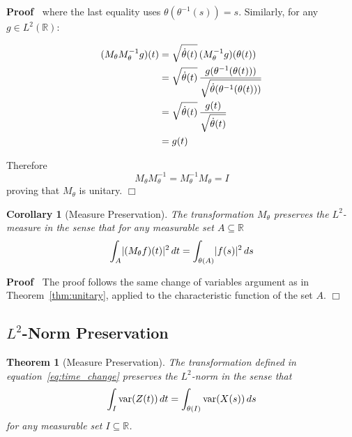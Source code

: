 \documentclass{article}
\newenvironment{proof}{\noindent\textbf{Proof\ }}{\hspace*{\fill}$\Box$\medskip}
\newtheorem{corollary}{Corollary}
\newtheorem{theorem}{Theorem}
\begin{document}
\begin{proof}
  where the last equality uses $\theta (\theta^{- 1} (s)) = s$. Similarly, for
  any $g \in L^2 (\mathbb{R})$:
  
  \begin{align}
    (M_{\theta} M_{\theta}^{- 1} g) (t) & = \sqrt{\dot{\theta} (t)} 
    \hspace{0.17em} (M_{\theta}^{- 1} g) (\theta (t)) \\
    & = \sqrt{\dot{\theta} (t)}  \hspace{0.17em} \frac{g (\theta^{- 1}
    (\theta (t)))}{\sqrt{\dot{\theta} (\theta^{- 1} (\theta (t)))}} \\
    & = \sqrt{\dot{\theta} (t)}  \hspace{0.17em} \frac{g
    (t)}{\sqrt{\dot{\theta} (t)}} \\
    & = g (t) 
  \end{align}
  
  Therefore
  \begin{equation}
    M_{\theta} M_{\theta}^{- 1} = M_{\theta}^{- 1} M_{\theta} = I
  \end{equation}
  proving that $M_{\theta}$ is unitary.
\end{proof}

\begin{corollary}
  [Measure Preservation]\label{cor:measure_preserve} The transformation
  $M_{\theta}$ preserves the $L^2$-measure in the sense that for any
  measurable set $A \subseteq \mathbb{R}$
  \begin{equation}
    \label{eq:measure_preserve_sets} \int_A \lvert (M_{\theta} f) (t) \rvert^2
    \hspace{0.17em} dt = \int_{\theta (A)} \lvert f (s) \rvert^2 
    \hspace{0.17em} ds
  \end{equation}
\end{corollary}

\begin{proof}
  The proof follows the same change of variables argument as in
  Theorem~\ref{thm:unitary}, applied to the characteristic function of the set
  $A$.
\end{proof}

\subsection{$L^2$-Norm Preservation}\label{sec:norm_preservation}

\begin{theorem}
  [Measure Preservation]\label{thm:measure_preserve} The transformation
  defined in equation~\eqref{eq:time_change} preserves the $L^2$-norm in the
  sense that
  \begin{equation}
    \label{eq:measure_preserve} \int_I \mathrm{var} (Z (t))  \hspace{0.17em}
    dt = \int_{\theta (I)} \mathrm{var} (X (s))  \hspace{0.17em} ds
  \end{equation}
  for any measurable set $I \subseteq \mathbb{R}$.
\end{theorem}
\end{document}
